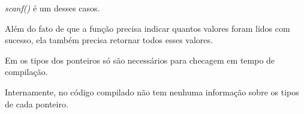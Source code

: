 \emph{scanf()} é um desses casos.

Além do fato de que a função precisa indicar quantos valores foram lidos com sucesso, ela também precisa retornar todos esses valores.

Em \CCpp os tipos dos ponteiros só são necessários para checagem em tempo de compilação.

Internamente, no código compilado não tem nenhuma informação sobre os tipos de cada ponteiro.





